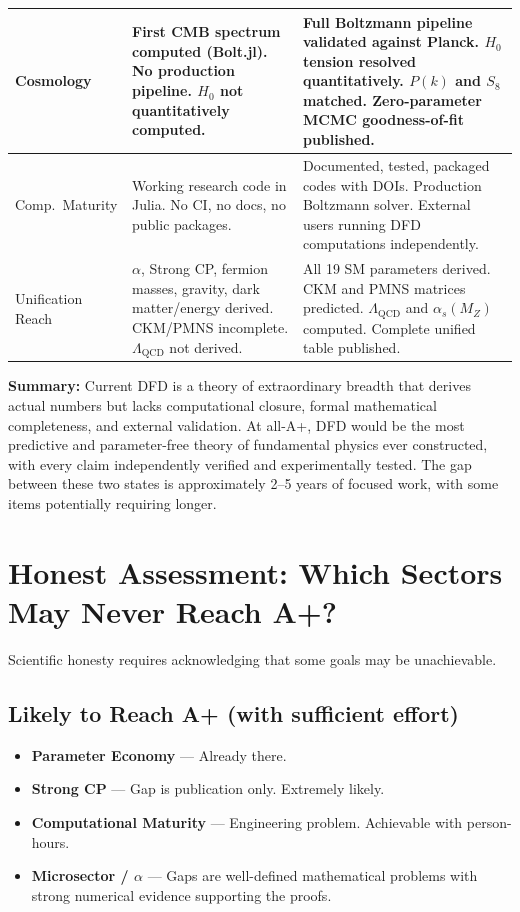 \documentclass[11pt,a4paper]{article}
\begin{document}
\begin{longtable}{p{3.5cm}p{5cm}p{5cm}}
\midrule
Cosmology &
First CMB spectrum computed (Bolt.jl). No production pipeline. $H_0$ not quantitatively computed. &
Full Boltzmann pipeline validated against Planck. $H_0$ tension resolved quantitatively. $P(k)$ and $S_8$ matched. Zero-parameter MCMC goodness-of-fit published. \\
\midrule
Comp.\ Maturity &
Working research code in Julia. No CI, no docs, no public packages. &
Documented, tested, packaged codes with DOIs. Production Boltzmann solver. External users running DFD computations independently. \\
\midrule
Unification Reach &
$\alpha$, Strong CP, fermion masses, gravity, dark matter/energy derived. CKM/PMNS incomplete. $\Lambda_{\text{QCD}}$ not derived. &
All 19 SM parameters derived. CKM and PMNS matrices predicted. $\Lambda_{\text{QCD}}$ and $\alpha_s(M_Z)$ computed. Complete unified table published. \\
\bottomrule
\end{longtable}

\noindent\textbf{Summary:} Current DFD is a theory of extraordinary breadth that derives actual numbers but lacks computational closure, formal mathematical completeness, and external validation. At all-A+, DFD would be the most predictive and parameter-free theory of fundamental physics ever constructed, with every claim independently verified and experimentally tested. The gap between these two states is approximately 2--5 years of focused work, with some items potentially requiring longer.


\section{Honest Assessment: Which Sectors May Never Reach A+?}

Scientific honesty requires acknowledging that some goals may be unachievable.

\subsection{Likely to Reach A+ (with sufficient effort)}
\begin{itemize}
    \item \textbf{Parameter Economy} --- Already there.
    \item \textbf{Strong CP} --- Gap is publication only. Extremely likely.
    \item \textbf{Computational Maturity} --- Engineering problem. Achievable with person-hours.
    \item \textbf{Microsector / $\alpha$} --- Gaps are well-defined mathematical problems with strong numerical evidence supporting the proofs.
\end{itemize}
\end{document}

